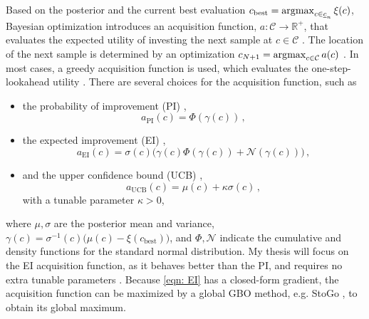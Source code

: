 Based on the posterior and the current best evaluation 
$c_{\textrm{best}} = \operatorname*{\arg\!\max}_{c\in \underline{c}_n}\xi(c)$, 
Bayesian optimization introduces an acquisition function,
$a:\mathcal{C} \rightarrow \mathbb{R}^+$, that evaluates the expected utility of
investing the next sample at $c\in \mathcal{C}$
\cite{GP bandit, practical Bayesian, review EI, jones1998, prob of improve}.
The location of the next sample is 
determined by an optimization $c_{N+1} = \operatorname*{\arg\!\max}_{c\in\mathcal{C}} a(c)$
\cite{GP bandit, practical Bayesian, review EI, jones1998, prob of improve}.
In most cases, a greedy acquisition function is used, which evaluates the one-step-lookahead utility
\cite{GP bandit, practical Bayesian, review EI, jones1998, prob of improve}.
There are several choices for the acquisition function, such as
\begin{itemize}
    \item the probability of improvement (PI) \cite{prob of improve}, 
        \begin{equation}
            a_{\textrm{PI}}(c) = \Phi(\gamma(c))\,,
        \end{equation}
    \item the expected improvement (EI) \cite{review EI, Locatelli}, 
        \begin{equation}
            a_{\textrm{EI}}(c) = \sigma(c) \big(\gamma(c)\Phi(\gamma(c))
            + \mathcal{N}(\gamma(c))\big)\,,
            \label{eqn: EI}
        \end{equation}
    \item and the upper confidence bound (UCB) \cite{GP bandit},
        \begin{equation}
            a_{\textrm{UCB}} (c) = \mu(c) + \kappa \sigma(c)\,,
        \end{equation}
        with a tunable parameter $\kappa>0$,
\end{itemize}
where $\mu, \sigma$ are the posterior mean and variance, 
$\gamma(c) = \sigma^{-1}(c)\big(\mu(c) - \xi(c_{\textrm{best}})\big)$,
and $\Phi, \mathcal{N}$ indicate the cumulative and
density functions for the standard normal distribution.
My thesis will focus on the EI acquisition function, as it behaves better 
than the PI, and requires no extra tunable parameters \cite{practical Bayesian}.
Because \eqref{eqn: EI} has a closed-form gradient, the acquisition function
can be maximized by a global GBO method, e.g. StoGo \cite{stogo 2}, to obtain its global maximum.\\

